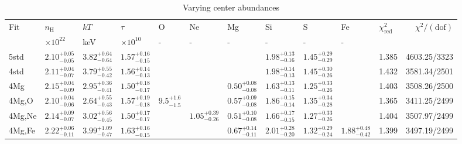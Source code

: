 \documentclass[preprint2,tighten,trackchanges]{aastex6}
\newcommand*{\mt}{\mathrm}
\begin{document}
\begin{table*}[!ht]
    \centering
    \caption{Varying center abundances\label{tab:annulus-varycenter}}
    \scriptsize
\begin{tabular}{@{}lllllllllllr@{}}
\toprule
Fit & $n_\mathrm{H}$ & $kT$ & $\tau$
        & O & Ne & Mg & Si & S & Fe
        & $\chi^2_{\mt{red}}$ & $\chi^2 / (\mt{dof})$ \\
    & $\times 10^{22}$ & keV & $\times 10^{10}$
        & - & - & - & - & - & -
        & & \\
\midrule
5std    & ${2.10}^{+0.05}_{-0.05}$ & ${3.82}^{+0.64}_{-0.64}$ & ${1.57}^{+0.16}_{-0.15}$
    &                 &                 &                          & ${1.98}^{+0.13}_{-0.16}$ & ${1.45}^{+0.29}_{-0.29}$ &
    & 1.385 & 4603.25/3323 \\
4std    & ${2.11}^{+0.04}_{-0.07}$ & ${3.79}^{+0.55}_{-0.42}$ & ${1.56}^{+0.14}_{-0.13}$
    &                 &                 &                          & ${1.98}^{+0.14}_{-0.13}$ & ${1.45}^{+0.30}_{-0.26}$ &
    & 1.432 & 3581.34/2501 \\

4Mg     & ${2.15}^{+0.04}_{-0.09}$ & ${2.95}^{+0.36}_{-0.41}$ & ${1.50}^{+0.18}_{-0.17}$
    &                 &                 & ${0.50}^{+0.08}_{-0.08}$ & ${1.63}^{+0.13}_{-0.11}$ & ${1.25}^{+0.33}_{-0.26}$ &
    & 1.403 & 3508.26/2500 \\

\midrule

4Mg,O   & ${2.10}^{+0.04}_{-0.06}$ & ${2.64}^{+0.55}_{-0.43}$ & ${1.57}^{+0.19}_{-0.18}$
    & ${9.5}^{+1.6}_{-1.5}$ &                 & ${0.57}^{+0.09}_{-0.08}$ & ${1.86}^{+0.15}_{-0.14}$ & ${1.35}^{+0.34}_{-0.28}$ &
    & 1.365 & 3411.25/2499 \\

4Mg,Ne  & ${2.14}^{+0.09}_{-0.07}$ & ${3.02}^{+0.56}_{-0.45}$ & ${1.50}^{+0.17}_{-0.17}$
    &                 & ${1.05}^{+0.39}_{-0.26}$ & ${0.51}^{+0.10}_{-0.08}$ & ${1.66}^{+0.17}_{-0.15}$ & ${1.27}^{+0.33}_{-0.26}$ &
    & 1.404 & 3507.97/2499 \\

4Mg,Fe  & ${2.22}^{+0.06}_{-0.11}$ & ${3.99}^{+1.09}_{-0.47}$ & ${1.63}^{+0.16}_{-0.15}$
    &                 &                 & ${0.67}^{+0.14}_{-0.11}$ & ${2.01}^{+0.28}_{-0.20}$ & ${1.32}^{+0.29}_{-0.24}$ & ${1.88}^{+0.48}_{-0.42}$
    & 1.399 & 3497.19/2499 \\


\end{tabular}
\end{table*}
\end{document}
